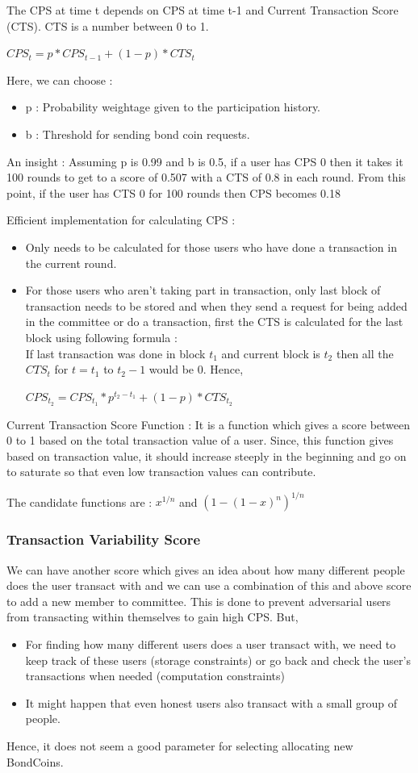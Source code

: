 The CPS at time t depends on CPS at time t-1 and Current Transaction Score (CTS). CTS is a number between 0 to 1.\\
\centerline{$CPS_t = p*CPS_{t-1} + (1-p)*CTS_t$}

Here, we can choose :
\begin{itemize}
    \item p : Probability weightage given to the participation history.
    \item b : Threshold for sending bond coin requests.
\end{itemize}

An insight : Assuming p is 0.99 and b is 0.5, if a user has CPS 0 then it takes it 100 rounds to get to a score of 0.507 with a CTS of 0.8 in each round. From this point, if the user has CTS 0 for 100 rounds then CPS becomes 0.18

Efficient implementation for calculating CPS :
\begin{itemize}
    \item Only needs to be calculated for those users who have done a transaction in the current round.
    \item For those users who aren't taking part in transaction, only last block of transaction needs to be stored and when they send a request for being added in the committee or do a transaction, first the CTS is calculated for the last block using following formula :\\
    If last transaction was done in block $t_1$ and current block is $t_2$ then all the $CTS_t$ for $t = t_1$ to $t_2-1$ would be 0. Hence,\\
    \centerline{$CPS_{t_2} = CPS_{t_1}*p^{t_2-t_1} + (1-p)*CTS_{t_2}$}
\end{itemize}

Current Transaction Score Function : It is a function which gives a score between 0 to 1 based on the total transaction value of a user. Since, this function gives based on transaction value, it should increase steeply in the beginning and go on to saturate so that even low transaction values can contribute.

The candidate functions are : $x^{1/n}$ and $(1-(1-x)^n)^{1/n}$

\subsubsection{Transaction Variability Score}
We can have another score which gives an idea about how many different people does the user transact with and we can use a combination of this and above score to add a new member to committee. This is done to prevent adversarial users from transacting within themselves to gain high CPS. But,
\begin{itemize}
    \item For finding how many different users does a user transact with, we need to keep track of these users (storage constraints) or go back and check the user's transactions when needed (computation constraints)
    \item It might happen that even honest users also transact with a small group of people.
\end{itemize}

Hence, it does not seem a good parameter for selecting allocating new BondCoins.